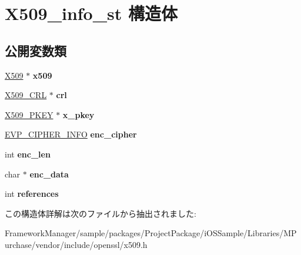 \hypertarget{struct_x509__info__st}{}\section{X509\+\_\+info\+\_\+st 構造体}
\label{struct_x509__info__st}
\subsection*{公開変数類}
\begin{DoxyCompactItemize}
\item 
\hypertarget{struct_x509__info__st_ab25bba431636552ba16640f61c42668c}{}\hyperlink{structx509__st}{X509} $\ast$ {\bfseries x509}\label{struct_x509__info__st_ab25bba431636552ba16640f61c42668c}

\item 
\hypertarget{struct_x509__info__st_aaf234a243b1abc907de008a71d984330}{}\hyperlink{struct_x509__crl__st}{X509\+\_\+\+C\+R\+L} $\ast$ {\bfseries crl}\label{struct_x509__info__st_aaf234a243b1abc907de008a71d984330}

\item 
\hypertarget{struct_x509__info__st_a06456585da668d208076cf6385f177aa}{}\hyperlink{structprivate__key__st}{X509\+\_\+\+P\+K\+E\+Y} $\ast$ {\bfseries x\+\_\+pkey}\label{struct_x509__info__st_a06456585da668d208076cf6385f177aa}

\item 
\hypertarget{struct_x509__info__st_a157d206dc1a125ab2b4c7d166a7de138}{}\hyperlink{structevp__cipher__info__st}{E\+V\+P\+\_\+\+C\+I\+P\+H\+E\+R\+\_\+\+I\+N\+F\+O} {\bfseries enc\+\_\+cipher}\label{struct_x509__info__st_a157d206dc1a125ab2b4c7d166a7de138}

\item 
\hypertarget{struct_x509__info__st_a8da5cd22fabb3c72738fabac57bbe64f}{}int {\bfseries enc\+\_\+len}\label{struct_x509__info__st_a8da5cd22fabb3c72738fabac57bbe64f}

\item 
\hypertarget{struct_x509__info__st_a7b4eaab0048c4e7b6d5a3dd9d70be609}{}char $\ast$ {\bfseries enc\+\_\+data}\label{struct_x509__info__st_a7b4eaab0048c4e7b6d5a3dd9d70be609}

\item 
\hypertarget{struct_x509__info__st_ab5653bf99a3d84cffed5ec7c52da92e3}{}int {\bfseries references}\label{struct_x509__info__st_ab5653bf99a3d84cffed5ec7c52da92e3}

\end{DoxyCompactItemize}


この構造体詳解は次のファイルから抽出されました\+:\begin{DoxyCompactItemize}
\item 
Framework\+Manager/sample/packages/\+Project\+Package/i\+O\+S\+Sample/\+Libraries/\+M\+Purchase/vendor/include/openssl/x509.\+h\end{DoxyCompactItemize}
